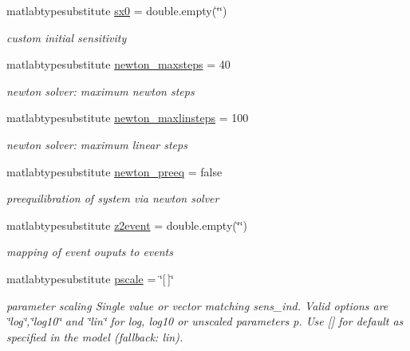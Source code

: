 \begin{DoxyCompactItemize}
matlabtypesubstitute \mbox{\hyperlink{classamioption_ae40f9a7172d3a41725c151afaec347f7}{sx0}} = double.\+empty(\char`\"{}\char`\"{})
\begin{DoxyCompactList}\small\item\em custom initial sensitivity \end{DoxyCompactList}\item 
matlabtypesubstitute \mbox{\hyperlink{classamioption_a003c445698766726237b11dc6e5120fe}{newton\+\_\+maxsteps}} = 40
\begin{DoxyCompactList}\small\item\em newton solver\+: maximum newton steps \end{DoxyCompactList}\item 
matlabtypesubstitute \mbox{\hyperlink{classamioption_abea544569240b7cfcb1505d125a3b51b}{newton\+\_\+maxlinsteps}} = 100
\begin{DoxyCompactList}\small\item\em newton solver\+: maximum linear steps \end{DoxyCompactList}\item 
matlabtypesubstitute \mbox{\hyperlink{classamioption_a6f07b6b706ac3305e478f576747ad088}{newton\+\_\+preeq}} = false
\begin{DoxyCompactList}\small\item\em preequilibration of system via newton solver \end{DoxyCompactList}\item 
matlabtypesubstitute \mbox{\hyperlink{classamioption_a7a7be015feeb7a346dceccd49e622b4b}{z2event}} = double.\+empty(\char`\"{}\char`\"{})
\begin{DoxyCompactList}\small\item\em mapping of event ouputs to events \end{DoxyCompactList}\item 
matlabtypesubstitute \mbox{\hyperlink{classamioption_a4dc67beb394b49ebeccf6a99dd932ee3}{pscale}} = \char`\"{}\mbox{[}$\,$\mbox{]}\char`\"{}
\begin{DoxyCompactList}\small\item\em parameter scaling Single value or vector matching sens\+\_\+ind. Valid options are \char`\"{}log\char`\"{},\char`\"{}log10\char`\"{} and \char`\"{}lin\char`\"{} for log, log10 or unscaled parameters p. Use \mbox{[}\mbox{]} for default as specified in the model (fallback\+: {\ttfamily lin}). \end{DoxyCompactList}\end{DoxyCompactItemize}


